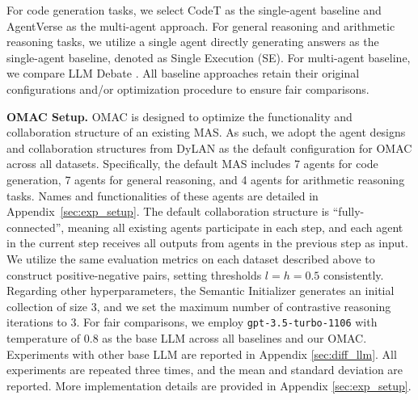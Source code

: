 
For code generation tasks, we select CodeT \cite{chen2023codet} as the single-agent baseline and AgentVerse \cite{chen2023agentverse} as the multi-agent approach. For general reasoning and arithmetic reasoning tasks, we utilize a single agent directly generating answers as the single-agent baseline, denoted as Single Execution (SE). For multi-agent baseline, we compare LLM Debate \cite{debate1-mit}. All baseline approaches retain their original configurations and/or optimization procedure to ensure fair comparisons.

\noindent \textbf{OMAC Setup.} OMAC is designed to optimize the functionality and collaboration structure of an existing MAS. 
As such, we adopt the agent designs and collaboration structures from DyLAN \cite{dylan} as the default configuration for OMAC across all datasets. Specifically, the default MAS includes 7 agents for code generation, 7 agents for general reasoning, and 4 agents for arithmetic reasoning tasks. 
Names and functionalities of these agents are detailed in Appendix~\ref{sec:exp_setup}.
The default collaboration structure is ``fully-connected'', meaning all existing agents participate in each step, and each agent in the current step receives all outputs from agents in the previous step as input. We utilize the same evaluation metrics on each dataset described above to construct positive-negative pairs, setting thresholds $l = h = 0.5$ consistently. Regarding other hyperparameters, the Semantic Initializer generates an initial collection of size 3, and we set the maximum number of contrastive reasoning iterations to 3. For fair comparisons, we employ {\small \texttt{gpt-3.5-turbo-1106}} with temperature of 0.8 as the base LLM across all baselines and our OMAC. Experiments with other base LLM are reported in Appendix \ref{sec:diff_llm}. All experiments are repeated three times, and the mean and standard deviation are reported.
More implementation details are provided in Appendix \ref{sec:exp_setup}.


